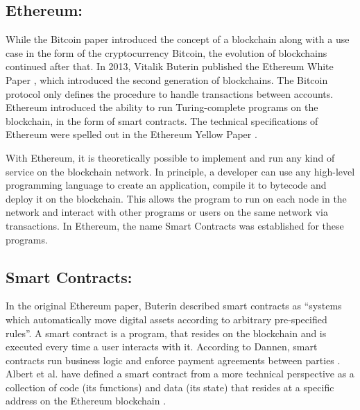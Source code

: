 \documentclass[10pt,conference]{IEEEtran}
\begin{document}
	\subsection{Ethereum:}
	
	While the Bitcoin paper introduced the concept of a blockchain along with a use case in the form of the cryptocurrency Bitcoin, the evolution of blockchains continued after that. In 2013, Vitalik Buterin published the Ethereum White Paper \cite{ethpaper}, which introduced the second generation of blockchains. The Bitcoin protocol only defines the procedure to handle transactions between accounts. Ethereum introduced the ability to run Turing-complete programs on the blockchain, in the form of smart contracts. The technical specifications of Ethereum were spelled out in the Ethereum Yellow Paper \cite{wood2019ethereum}.
	
	With Ethereum, it is theoretically possible to implement and run any kind of service on the blockchain network. In principle, a developer can use any high-level programming language to create an application, compile it to bytecode and deploy it on the blockchain. This allows the program to run on each node in the network and interact with other programs or users on the same network via transactions. In Ethereum, the name Smart Contracts was established for these programs.
	
	\subsection{Smart Contracts:}
	In the original Ethereum paper, Buterin described smart contracts as “systems which automatically move digital assets according to arbitrary pre-specified rules”\cite{ethpaper}. A smart contract is a program, that resides on the blockchain and is executed every time a user interacts with it. According to Dannen, smart contracts run business logic and enforce payment agreements between parties \cite{bitcoinbook}. Albert et al. have defined a smart contract from a more technical perspective as a collection of code (its functions) and data (its state) that resides at a specific address on the Ethereum blockchain \cite{gasol}. 
	
\end{document}
